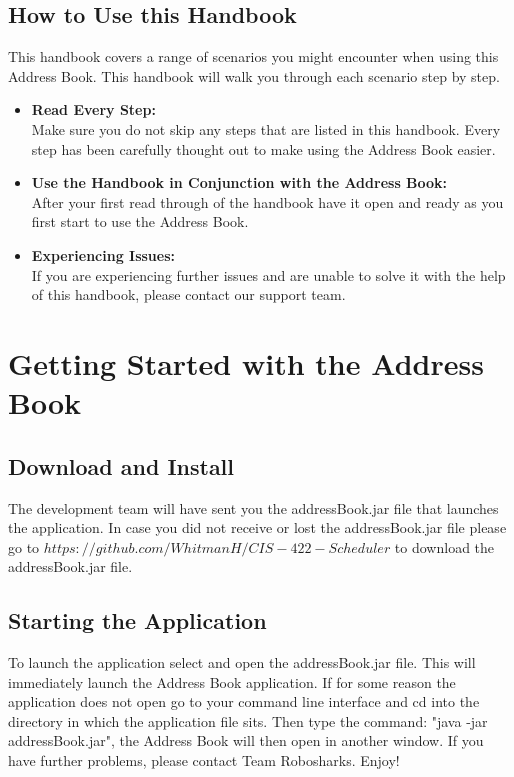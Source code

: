 \documentclass[a4paper, 11pt]{article}
\begin{document}
\subsection{How to Use this Handbook}
This handbook covers a range of scenarios you might encounter when using this Address Book. This handbook will walk you through each scenario step by step.
\begin{itemize}
  \item \textbf{Read Every Step:} \\ Make sure you do not skip any steps that are listed in this handbook. Every step has been carefully thought out to make using the Address Book easier.
  \item \textbf{Use the Handbook in Conjunction with the Address Book:} \\ After your first read through of the handbook have it open and ready as you first start to use the Address Book.
  \item \textbf{Experiencing Issues:} \\ If you are experiencing further issues and are unable to solve it with the help of this handbook, please contact our support team.
\end{itemize}

\clearpage

\section{Getting Started with the Address Book}
\subsection{Download and Install}
The development team will have sent you the addressBook.jar file that launches the application. In case you did not receive or lost the addressBook.jar file please go to \(https://github.com/WhitmanH/CIS-422-Scheduler\) to download the addressBook.jar file. 
\subsection{Starting the Application}
To launch the application select and open the addressBook.jar file. This will immediately launch the Address Book application. If for some reason the application does not open go to your command line interface and cd into the directory in which the application file sits. Then type the command: "java -jar addressBook.jar", the Address Book will then open in another window. If you have further problems, please contact Team Robosharks. Enjoy!
\end{document}
